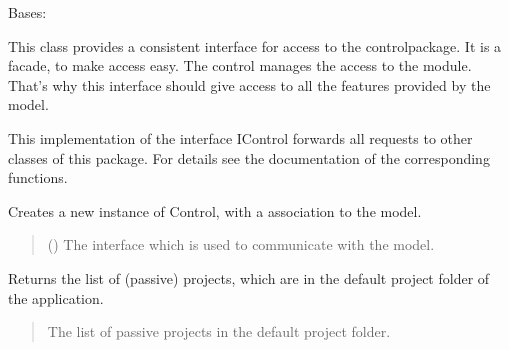 \documentclass[letterpaper,10pt,english]{sphinxmanual}
\begin{document}
\begin{fulllineitems}
\label{\detokenize{apidoc/src.osm_configurator.control:src.osm_configurator.control.control.Control}}
\pysigstartsignatures
{}
\pysigstopsignatures
\sphinxAtStartPar
Bases: {\hyperref[\detokenize{apidoc/src.osm_configurator.control:src.osm_configurator.control.control_interface.IControl}]{}}

\sphinxAtStartPar
This class provides a consistent interface for access to the control\sphinxhyphen{}package. It is a facade, to make access easy.
The control manages the access to the module. That’s why this interface should give access to all the features provided by the model.

\sphinxAtStartPar
This implementation of the interface IControl forwards all requests to other classes of this package.
For details see the documentation of the corresponding functions.

\begin{fulllineitems}
\label{\detokenize{apidoc/src.osm_configurator.control:src.osm_configurator.control.control.Control.__init__}}
\pysigstartsignatures
{}
\pysigstopsignatures
\sphinxAtStartPar
Creates a new instance of Control, with a association to the model.
\begin{quote}\begin{description}
\sphinxAtStartPar
{} ({\hyperref[\detokenize{apidoc/src.osm_configurator.model.application:src.osm_configurator.model.application.application_interface.IApplication}]{}}) \textendash{} The interface which is used to communicate with the model.

\end{description}\end{quote}

\end{fulllineitems}


\begin{fulllineitems}
\label{\detokenize{apidoc/src.osm_configurator.control:src.osm_configurator.control.control.Control.get_list_of_passive_projects}}
\pysigstartsignatures
{}
\pysigstopsignatures
\sphinxAtStartPar
Returns the list of (passive) projects, which are in the default project folder of the application.
\begin{quote}\begin{description}
\sphinxAtStartPar
The list of passive projects in the default project folder.


\end{description}
\end{quote}
\end{fulllineitems}
\end{fulllineitems}
\end{document}
